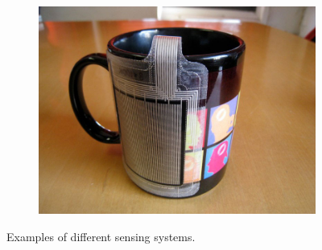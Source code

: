 \begin{figure}[h]
\begin{subfigure}[b]{.28\textwidth}
    \label{sofa_interaction:ipad}
  \end{subfigure}
  \hspace{0.03\textwidth}
  \begin{subfigure}[b]{.28\textwidth}
    \centering
    \includegraphics[width=\linewidth]{figures/touch/unmousepad}
    \label{sofa_interaction:unmousepad}
  \end{subfigure}
  \caption{Examples of different sensing systems.}
  \label{sofa_interaction:sensing_systems}
\end{figure}

